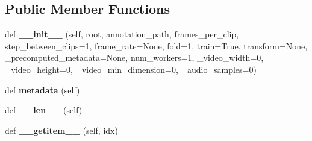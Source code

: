 \subsection*{Public Member Functions}
\begin{DoxyCompactItemize}
\item 
\mbox{\label{classtorchvision_1_1datasets_1_1ucf101_1_1UCF101_a9589cf9a9ef3379849cac59d97a93bf0}} 
def {\bfseries \+\_\+\+\_\+init\+\_\+\+\_\+} (self, root, annotation\+\_\+path, frames\+\_\+per\+\_\+clip, step\+\_\+between\+\_\+clips=1, frame\+\_\+rate=None, fold=1, train=True, transform=None, \+\_\+precomputed\+\_\+metadata=None, num\+\_\+workers=1, \+\_\+video\+\_\+width=0, \+\_\+video\+\_\+height=0, \+\_\+video\+\_\+min\+\_\+dimension=0, \+\_\+audio\+\_\+samples=0)
\item 
\mbox{\label{classtorchvision_1_1datasets_1_1ucf101_1_1UCF101_aef8c50560cef014c36359d409da86954}} 
def {\bfseries metadata} (self)
\item 
\mbox{\label{classtorchvision_1_1datasets_1_1ucf101_1_1UCF101_a5ff91666b1db5d2cde5fbb820f5f461c}} 
def {\bfseries \+\_\+\+\_\+len\+\_\+\+\_\+} (self)
\item 
\mbox{\label{classtorchvision_1_1datasets_1_1ucf101_1_1UCF101_a322e4af0f2f80a769344384ecd077333}} 
def {\bfseries \+\_\+\+\_\+getitem\+\_\+\+\_\+} (self, idx)
\end{DoxyCompactItemize}
